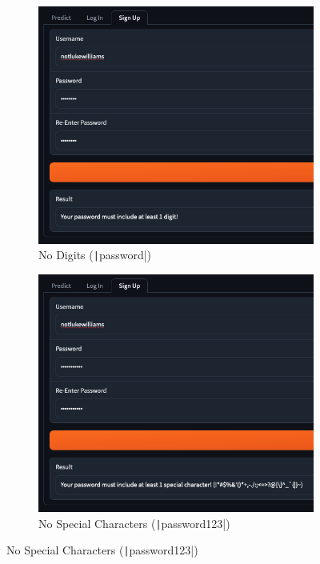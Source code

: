 \documentclass[12pt]{report}
\newcommand{\pil}[1]{\protect\texttt|#1|}
\begin{document}
\begin{figure}[H]
\begin{subfigure}{.45\linewidth}
    \centering
    \includegraphics[width=\linewidth]{ss15.8c.png}
    \caption{No Digits (\pil{password})}
\end{subfigure}
\begin{subfigure}{.45\linewidth}
    \centering
    \includegraphics[width=\linewidth]{ss15.8d.png}
    \caption{No Special Characters (\pil{password123})}
\end{subfigure}


\end{figure}
\end{document}
